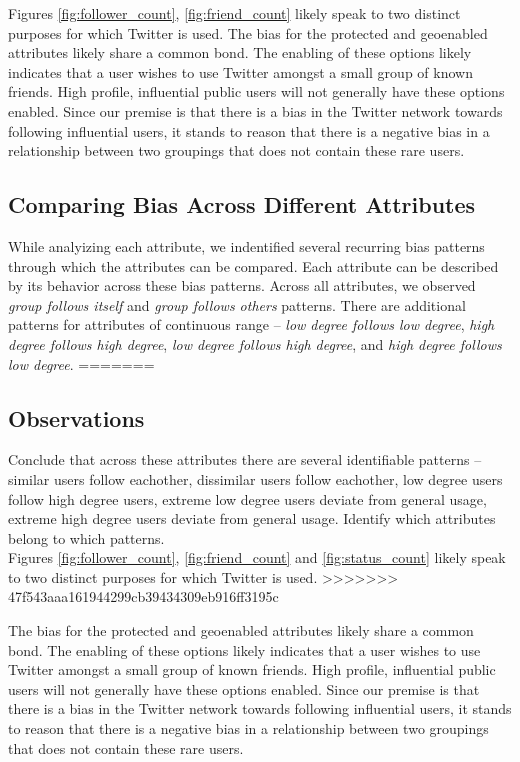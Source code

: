 Figures \ref{fig:follower_count}, \ref{fig:friend_count} likely speak to two distinct purposes for which Twitter is used.  The bias for the protected and geoenabled attributes likely share a common bond.  The enabling of these options likely indicates that a user wishes to use Twitter amongst a small group of known friends.  High profile, influential public users will not generally have these options enabled.  Since our premise is that there is a bias in the Twitter network towards following influential users, it stands to reason that there is a negative bias in a relationship between two groupings that does not contain these rare users.

\subsection{Comparing Bias Across Different Attributes}
\label{sub:crossattribute}
While analyizing each attribute, we indentified several recurring bias patterns through which the attributes can be compared.  Each attribute can be described by its behavior across these bias patterns.  Across all attributes, we observed \textit{group follows itself} and \textit{group follows others} patterns.  There are additional patterns for attributes of continuous range -- \textit{low degree follows low degree}, \textit{high degree follows high degree}, \textit{low degree follows high degree}, and \textit{high degree follows low degree}.
=======
\subsection{Observations}
Conclude that across these attributes there are several identifiable patterns -- similar users follow eachother, dissimilar users follow eachother, low degree users follow high degree users, extreme low degree users deviate from general usage, extreme high degree users deviate from general usage.  Identify which attributes belong to which patterns.\\

Figures \ref{fig:follower_count}, \ref{fig:friend_count} and \ref{fig:status_count} likely speak to two distinct purposes for which Twitter is used.
>>>>>>> 47f543aaa161944299cb39434309eb916ff3195c

The bias for the protected and geoenabled attributes likely share a common bond.  The enabling of these options likely indicates that a user wishes to use Twitter amongst a small group of known friends.  High profile, influential public users will not generally have these options enabled.  Since our premise is that there is a bias in the Twitter network towards following influential users, it stands to reason that there is a negative bias in a relationship between two groupings that does not contain these rare users.
